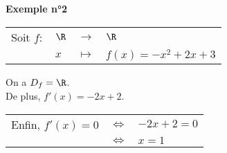 \newpage

\textbf{Exemple n°2} \\

\begin{tabular}{llll}
\hspace{-.3cm} Soit $f:$ & $\R$ & $\longrightarrow$ & $\R$ \\
& $x$ & $\longmapsto$ & $f(x) = -x^2 + 2x + 3$ \\
\end{tabular}

\vspace*{.3cm}

On a $D_f = \R$. \\

De plus, $f'(x) = -2x + 2$. \\

\begin{tabular}{lll}
\hspace*{-.3cm} Enfin, $f'(x) = 0$ & $\Longleftrightarrow$ & $-2x+2 = 0$ \\
& $\Longleftrightarrow$ & $x = 1$ \\
\end{tabular}

\vspace*{.3cm}


\vspace*{1.2cm}

